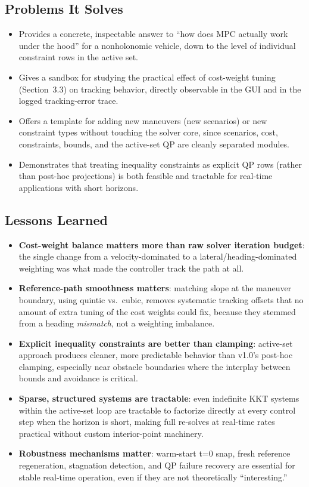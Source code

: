 ﻿\documentclass[11pt,a4paper]{article}
\begin{document}
\subsection{Problems It Solves}
\begin{itemize}[leftmargin=1.2cm]
  \item Provides a concrete, inspectable answer to ``how does MPC actually work under the hood'' for a nonholonomic vehicle, down to the level of individual constraint rows in the active set.
  \item Gives a sandbox for studying the practical effect of cost-weight tuning (Section~3.3) on tracking behavior, directly observable in the GUI and in the logged tracking-error trace.
  \item Offers a template for adding new maneuvers (new scenarios) or new constraint types without touching the solver core, since scenarios, cost, constraints, bounds, and the active-set QP are cleanly separated modules.
  \item Demonstrates that treating inequality constraints as explicit QP rows (rather than post-hoc projections) is both feasible and tractable for real-time applications with short horizons.
\end{itemize}

\subsection{Lessons Learned}
\begin{itemize}[leftmargin=1.2cm]
  \item \textbf{Cost-weight balance matters more than raw solver iteration budget}: the single change from a velocity-dominated to a lateral/heading-dominated weighting was what made the controller track the path at all.
  \item \textbf{Reference-path smoothness matters}: matching slope at the maneuver boundary, using quintic vs.\ cubic, removes systematic tracking offsets that no amount of extra tuning of the cost weights could fix, because they stemmed from a heading \emph{mismatch}, not a weighting imbalance.
  \item \textbf{Explicit inequality constraints are better than clamping}: active-set approach produces cleaner, more predictable behavior than v1.0's post-hoc clamping, especially near obstacle boundaries where the interplay between bounds and avoidance is critical.
  \item \textbf{Sparse, structured systems are tractable}: even indefinite KKT systems within the active-set loop are tractable to factorize directly at every control step when the horizon is short, making full re-solves at real-time rates practical without custom interior-point machinery.
  \item \textbf{Robustness mechanisms matter}: warm-start t=0 snap, fresh reference regeneration, stagnation detection, and QP failure recovery are essential for stable real-time operation, even if they are not theoretically ``interesting.''
\end{itemize}
\end{document}
